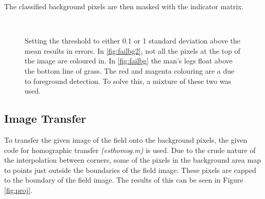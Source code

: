 \documentclass[11pt]{article}
\begin{document}
The classified background pixels are then masked with the indicator matrix.

\begin{figure}
  \centering
   ~
  \caption{Setting the threshold to either 0.1 or 1 standard deviation above the mean results in errors. In \ref{fig:failbg2}, not all the pixels at the top of the image are coloured in. In \ref{fig:failbg} the man's legs float above the bottom line of grass. The red and magenta colouring are a due to foreground detection. To solve this, a mixture of these two was used.}
  \label{fig:failing}
\end{figure}

\subsection{Image Transfer}

To transfer the given image of the field onto the background pixels, the given code for homographic transfer \emph{(esthomog.m)} is used. Due to the crude nature of the interpolation between corners, some of the pixels in the background area map to points just outside the boundaries of the field image. These pixels are capped to the boundary of the field image. The results of this can be seen in Figure \ref{fig:proj}.
\end{document}
